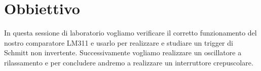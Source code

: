 \section*{Obbiettivo}

In questa sessione di laboratorio vogliamo verificare il corretto funzionamento del nostro comparatore LM311 e usarlo per realizzare e studiare un trigger di Schmitt non invertente. Successivamente vogliamo realizzare un oscillatore a rilassamento e per concludere andremo a realizzare un interruttore crepuscolare.
